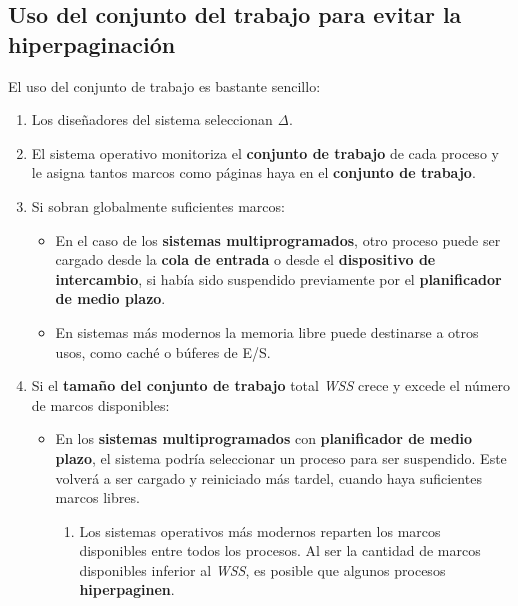 \subsection{Uso del conjunto del trabajo para evitar la
hiperpaginación}\label{_uso_del_conjunto_del_trabajo_para_evitar_la_hiperpaginaciuxf3n}

El uso del conjunto de trabajo es bastante sencillo:

\begin{enumerate}
\def\labelenumi{\arabic{enumi}.}
\item
  Los diseñadores del sistema seleccionan \emph{Δ}.
\item
  El sistema operativo monitoriza el \textbf{conjunto de trabajo} de
  cada proceso y le asigna tantos marcos como páginas haya en el
  \textbf{conjunto de trabajo}.
\item
  Si sobran globalmente suficientes marcos:

  \begin{itemize}
  \item
    En el caso de los \textbf{sistemas multiprogramados}, otro proceso
    puede ser cargado desde la \textbf{cola de entrada} o desde el
    \textbf{dispositivo de intercambio}, si había sido suspendido
    previamente por el \textbf{planificador de medio plazo}.
  \item
    En sistemas más modernos la memoria libre puede destinarse a otros
    usos, como caché o búferes de E/S.
  \end{itemize}
\item
  Si el \textbf{tamaño del conjunto de trabajo} total \emph{WSS} crece y
  excede el número de marcos disponibles:

  \begin{itemize}
  \item
    En los \textbf{sistemas multiprogramados} con \textbf{planificador
    de medio plazo}, el sistema podría seleccionar un proceso para ser
    suspendido. Este volverá a ser cargado y reiniciado más tardel,
    cuando haya suficientes marcos libres.

    \begin{enumerate}
    \def\labelenumii{\alph{enumii}.}
    \item
      Los sistemas operativos más modernos reparten los marcos
      disponibles entre todos los procesos. Al ser la cantidad de marcos
      disponibles inferior al \emph{WSS}, es posible que algunos
      procesos \textbf{hiperpaginen}.
    \end{enumerate}
  \end{itemize}
\end{enumerate}

